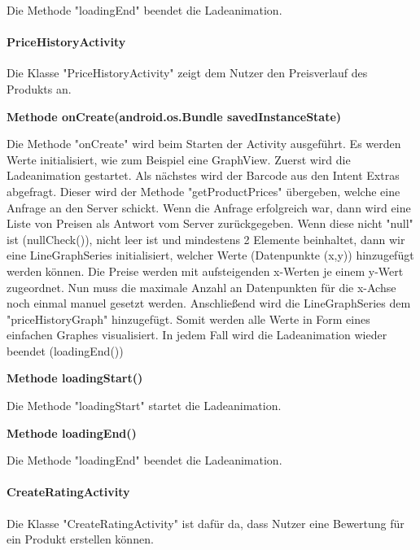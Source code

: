 \documentclass{scrartcl}
\begin{document}
\noindent Die Methode "loadingEnd" beendet die Ladeanimation. \newline

\paragraph{PriceHistoryActivity}
Die Klasse "PriceHistoryActivity" zeigt dem Nutzer den Preisverlauf des Produkts an. \newline 

\noindent\textbf{Methode onCreate(android.os.Bundle savedInstanceState)}

\noindent Die Methode "onCreate" wird beim Starten der Activity ausgeführt. Es werden Werte initialisiert, wie zum Beispiel eine GraphView. Zuerst wird die Ladeanimation gestartet. Als nächstes wird der Barcode aus den Intent Extras abgefragt. Dieser wird der Methode "getProductPrices" übergeben, welche eine Anfrage an den Server schickt. Wenn die Anfrage erfolgreich war, dann wird eine Liste von Preisen als Antwort vom Server zurückgegeben. Wenn diese nicht "null" ist (nullCheck()), nicht leer ist und mindestens 2 Elemente beinhaltet, dann wir eine LineGraphSeries initialisiert, welcher Werte (Datenpunkte (x,y)) hinzugefügt werden können. Die Preise werden mit aufsteigenden x-Werten je einem y-Wert zugeordnet. Nun muss die maximale Anzahl an Datenpunkten für die x-Achse noch einmal manuel gesetzt werden. Anschließend wird die LineGraphSeries dem "priceHistoryGraph" hinzugefügt. Somit werden alle Werte in Form eines einfachen Graphes visualisiert. In jedem Fall wird die Ladeanimation wieder beendet (loadingEnd()) \newline

\noindent\textbf{Methode loadingStart()}

\noindent Die Methode "loadingStart" startet die Ladeanimation. \newline

\noindent\textbf{Methode loadingEnd()}

\noindent Die Methode "loadingEnd" beendet die Ladeanimation. \newline

\paragraph{CreateRatingActivity}
Die Klasse "CreateRatingActivity" ist dafür da, dass Nutzer eine Bewertung für ein Produkt erstellen können. \newline 
\end{document}
